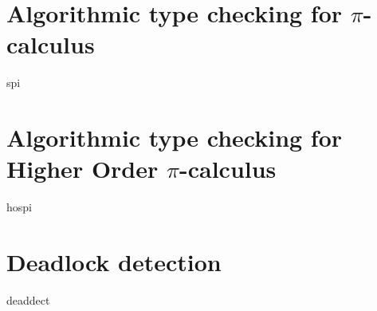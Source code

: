 \section{Algorithmic type checking for \texorpdfstring{$\pi$}{pi}-calculus}
\label{algotypepi}
{spi}

\section{Algorithmic type checking for Higher Order \texorpdfstring{$\pi$}{pi}-calculus}
\label{algotypehopi}
{hospi}

\section{Deadlock detection}
\label{deadlocktheory}
{deaddect}